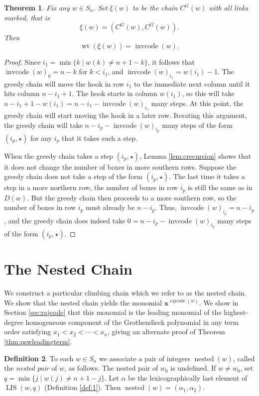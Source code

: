 \documentclass[11pt]{amsart}
\newtheorem{theorem}{Theorem}[section]
\theoremstyle{definition}
\newtheorem{definition}[theorem]{Definition}
\theoremstyle{named}
\newcommand{\CG}{C^G}
\DeclareMathOperator{\cc}{\mathrm{invcode}} %
\DeclareMathOperator{\rr}{\mathrm{rajcode}} %
\DeclareMathOperator{\nested}{\mathrm{nested}}
\DeclareMathOperator{\LIS}{\mathrm{LIS}}
\DeclareMathOperator{\wt}{\mathrm{wt}}
\begin{document}
	\begin{theorem}
		\label{thm:lehmerequality}		
		Fix any $w\in S_n$. Set $\xi(w)$ to be the chain $\CG(w)$ with all links marked, that is \[\xi(w)=(\CG(w),\CG(w)).\] Then \[\wt(\xi(w)) = \cc(w). \]
	\end{theorem}
	\begin{proof}
		Since $i_1=\min\{k\mid w(k)\neq n+1-k\}$, it follows that $\cc(w)_k = n-k$ for $k<i_1$, and $\cc(w)_{i_1} = w(i_1)-1$. The greedy chain will move the hook in row $i_1$ to the immediate next column until it hits column $n-i_1+1$. The hook starts in column $w(i_1)$, so this will take $n-i_1+1-w(i_1) = n-i_1-\cc(w)_{i_1}$ many steps. At this point,
		the greedy chain will start moving the hook in a later row. Iterating this argument, the greedy chain will take $n-i_p-\cc(w)_{i_p}$ many steps of the form $(i_p,\star)$ for any $i_p$ that it takes such a step. 
		
		When the greedy chain takes a step $(i_p,\star)$, Lemma \ref{lem:crecursion} shows that it does not change the number of boxes in more southern rows. Suppose the greedy chain does not take a step of the form $(i_p,\star)$. The last time it takes a step in a more northern row, the number of boxes in row $i_p$ is still the same as in $D(w)$. But the greedy chain then proceeds to a more southern row, so the number of boxes in row $i_p$ must already be $n-i_p$. Thus, $\cc(w)_{i_p}=n-i_p$, and the greedy chain does indeed take $0=n-i_p-\cc(w)_{i_p}$ many steps of the form $(i_p,\star)$.
	\end{proof}

	\section{The Nested Chain} \label{sec:nested}
	
	We construct a particular climbing chain which we refer to as the nested chain. We show that the nested chain yields the monomial $\bm{x}^{\rr(w)}$. We show in Section \ref{sec:rajcode} that this monomial is the leading monomial of the highest-degree homogeneous component of the Grothendieck polynomial in any term order satisfying $x_1<x_2<\cdots<x_n$, giving an alternate proof of Theorem \ref{thm:pswleadingterm}.

	
	\begin{definition}
		To each $w\in S_n$ we associate a pair of integers $\nested(w)$, called the \emph{nested pair} of $w$, as follows. The nested pair of $w_0$ is undefined.
		If $w\neq w_0$, set $q=\min\{j\mid w(j)\neq n+1-j\}$. Let $\alpha$ be the lexicographically last element of $\LIS(w,q)$ (Definition \ref{def:1}). Then $\nested(w)=(\alpha_1,\alpha_2)$.
	\end{definition}
	
\end{document}
